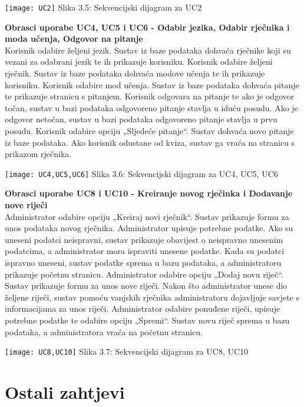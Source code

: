 				\texttt{[image: UC2]}
				Slika 3.5: Sekvencijski dijagram za UC2\newpage				
				
				
				\noindent\textbf{Obrasci uporabe UC4, UC5 i UC6 - Odabir jezika, Odabir rječnika i moda učenja, Odgovor na pitanje}\\
				Korisnik odabire željeni jezik. Sustav iz baze podataka dohvaća rječnike koji su vezani za odabrani jezik te ih prikazuje korisniku. Korisnik odabire željeni rječnik. Sustav iz baze podataka dohvaća modove učenja te ih prikazuje korisniku. Korisnik odabire mod učenja. Sustav iz baze podataka dohvaća pitanje te prikazuje stranicu s pitanjem. Korisnik odgovara na pitanje te ako je odgovor točan, sustav u bazi podataka odgovoreno pitanje stavlja u iduću posudu. Ako je odgovor netočan, sustav u bazi podataka odgovoreno pitanje stavlja u prvu posudu. Korisnik odabire opciju „Sljedeće pitanje“. Sustav dohvaća novo pitanje iz baze podataka. Ako korisnik odustane od kviza, sustav ga vraća na stranicu s prikazom rječnika.
				
				\texttt{[image: UC4,UC5,UC6]}
				Slika 3.6: Sekvencijski dijagram za UC4, UC5, UC6\newpage
				
				
				\noindent\textbf{Obrasci uporabe UC8 i UC10 - Kreiranje novog rječinka i Dodavanje nove riječi}\\
				Administrator odabire opciju „Kreiraj novi rječnik“. Sustav prikazuje formu za unos podataka novog rječnika. Administrator upisuje potrebne podatke. Ako su uneseni podatci neispravni, sustav prikazuje obavijest o neispravno unesenim podatcima, a administrator mora ispraviti unesene podatke. Kada su podatci ispravno uneseni, sustav podatke sprema u bazu podataka, a administratoru prikazuje početnu stranicu. Administrator odabire opciju „Dodaj novu riječ“. Sustav prikazuje formu za unos nove riječi. Nakon što administrator unese dio željene riječi, sustav pomoću vanjskih rječnika administratoru dojavljuje savjete s informacijama za unos riječi. Administrator odabire ponuđene riječi, upisuje potrebne podatke te odabire opciju „Spremi“. Sustav novu riječ sprema u bazu podataka, a administratora vraća na početnu stranicu.
				
				\texttt{[image: UC8,UC10]}
				Slika 3.7: Sekvencijski dijagram za UC8, UC10\newpage
	
		\section{Ostali zahtjevi}
		

